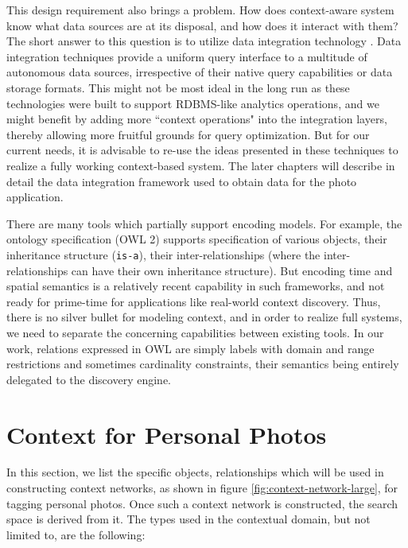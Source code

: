 This design requirement also brings a problem. How does context-aware system know what data sources are at its disposal, and how does it interact with them? The short answer to this question is to utilize data integration technology \cite{doan2005semantic, halevy2001answering, lenzerini2002data}. Data integration techniques provide a uniform query interface to a multitude of autonomous data sources, irrespective of their native query capabilities or data storage formats. This might not be most ideal in the long run as these technologies were built to support RDBMS-like analytics operations, and we might benefit by adding more ``context operations" into the integration layers, thereby allowing more fruitful grounds for query optimization. But for our current needs, it is advisable to re-use the ideas presented in these techniques to realize a fully working context-based system. The later chapters will describe in detail the data integration framework used to obtain data for the photo application.

There are many tools which partially support encoding models. For example, the ontology specification (OWL 2) supports specification of various objects, their inheritance structure (\texttt{is-a}), their inter-relationships (where the inter-relationships can have their own inheritance structure). But encoding time and spatial semantics is a relatively recent capability \cite{hobbs2006time} in such frameworks, and not ready for prime-time for applications like real-world context discovery. Thus, there is no silver bullet for modeling context, and in order to realize full systems, we need to separate the concerning capabilities between existing tools. In our work, relations expressed in OWL are simply labels with domain and range restrictions and sometimes cardinality constraints, their semantics being entirely delegated to the discovery engine.

\section{Context for Personal Photos}
In this section, we list the specific objects, relationships which will be used in constructing context networks, as shown in figure \ref{fig:context-network-large}, for tagging personal photos. Once such a context network is constructed, the search space is derived from it. The types used in the contextual domain, but not limited to, are the following:


